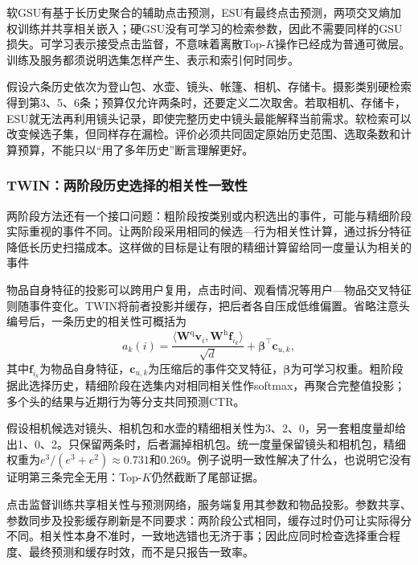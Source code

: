 软GSU有基于长历史聚合的辅助点击预测，ESU有最终点击预测，两项交叉熵加权训练并共享相关嵌入；硬GSU没有可学习的检索参数，因此不需要同样的GSU损失。可学习表示接受点击监督，不意味着离散Top-$K$操作已经成为普通可微层。训练及服务都须说明选集怎样产生、表示和索引何时同步。

假设六条历史依次为登山包、水壶、镜头、帐篷、相机、存储卡。摄影类别硬检索得到第3、5、6条；预算仅允许两条时，还要定义二次取舍。若取相机、存储卡，ESU就无法再利用镜头记录，即使完整历史中镜头最能解释当前需求。软检索可以改变候选子集，但同样存在漏检。评价必须共同固定原始历史范围、选取条数和计算预算，不能只以“用了多年历史”断言理解更好。

\subsubsection{TWIN：两阶段历史选择的相关性一致性}
\label{sec:rs-twin}

两阶段方法还有一个接口问题：粗阶段按类别或内积选出的事件，可能与精细阶段实际重视的事件不同。让两阶段采用相同的候选—行为相关性计算，通过拆分特征降低长历史扫描成本。这样做的目标是让有限的精细计算留给同一度量认为相关的事件

物品自身特征的投影可以跨用户复用，点击时间、观看情况等用户—物品交叉特征则随事件变化。TWIN将前者投影并缓存，把后者各自压成低维偏置。省略注意头编号后，一条历史的相关性可概括为
\begin{equation}
  a_k(i)=
  \frac{\langle\bm{W}^{\mathrm{q}}\bm{v}_i,
                 \bm{W}^{\mathrm{h}}\bm{f}_{i_k}\rangle}{\sqrt d}
       +\bm{\beta}^{\top}\bm{c}_{u,k},
  \label{eq:rs-twin-score}
\end{equation}
其中$\bm{f}_{i_k}$为物品自身特征，$\bm{c}_{u,k}$为压缩后的事件交叉特征，$\bm{\beta}$为可学习权重。粗阶段据此选择历史，精细阶段在选集内对相同相关性作softmax，再聚合完整值投影；多个头的结果与近期行为等分支共同预测CTR。

假设相机候选对镜头、相机包和水壶的精细相关性为3、2、0，另一套粗度量却给出1、0、2。只保留两条时，后者漏掉相机包。统一度量保留镜头和相机包，精细权重为$e^3/(e^3+e^2)\approx0.731$和0.269。例子说明一致性解决了什么，也说明它没有证明第三条完全无用：Top-$K$仍然截断了尾部证据。

点击监督训练共享相关性与预测网络，服务端复用其参数和物品投影。参数共享、参数同步及投影缓存刷新是不同要求：两阶段公式相同，缓存过时仍可让实际得分不同。相关性本身不准时，一致地选错也无济于事；因此应同时检查选择重合程度、最终预测和缓存时效，而不是只报告一致率。

